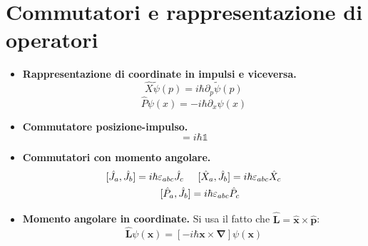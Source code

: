 \documentclass[11pt, a4paper]{scrartcl} %
\numberwithin{equation}{section}
\theoremstyle{style2}
\theoremstyle{style1}
\begin{document}
\section{Commutatori e rappresentazione di operatori}
\begin{multicols}{2}
	\begin{itemize}
		\item {\sffamily \bfseries Rappresentazione di coordinate in impulsi e viceversa.}
			\begin{equation}
				\hat{X}\widetilde{\psi }(p) = i\hbar \partial _p \widetilde{\psi }(p)
			\end{equation}
			\begin{equation}
				\hat{P} \psi (x) = - i \hbar  \partial _x \psi (x)
			\end{equation}
			\item {\sffamily \bfseries Commutatore posizione-impulso.} 
				\begin{equation}
					[\hat{X},\hat{P}] = i\hbar \mathds{1}
				\end{equation}
				\item {\sffamily \bfseries Commutatori con momento angolare.} 
					\begin{equation*}
						\begin{split}
							[\hat{J}_a , \hat{J}_b] = i\hbar \varepsilon _{abc} \hat{J}_c \hspace{.25cm}&\hspace{.25cm} [\hat{X}_a, \hat{J}_b] = i \hbar \varepsilon _{abc} \hat{X}_c\\
							[\hat{P}_a, \hat{J}_b] &= i\hbar \varepsilon _{abc} \hat{P}_c
						\end{split}
					\end{equation*}
					\item {\sffamily \bfseries Momento angolare in coordinate.} Si usa il fatto che $\hat{\mathbf{L} }= \hat{\mathbf{x} } \times \hat{\mathbf{p} }$:
						\begin{equation}
							\hat{\mathbf{L} } \psi (\mathbf{x} ) =  \left[ -i\hbar \mathbf{x} \times \pmb{\nabla } \right]  \psi (\mathbf{x} )
						\end{equation}
	\end{itemize}
\end{multicols}
\end{document}
